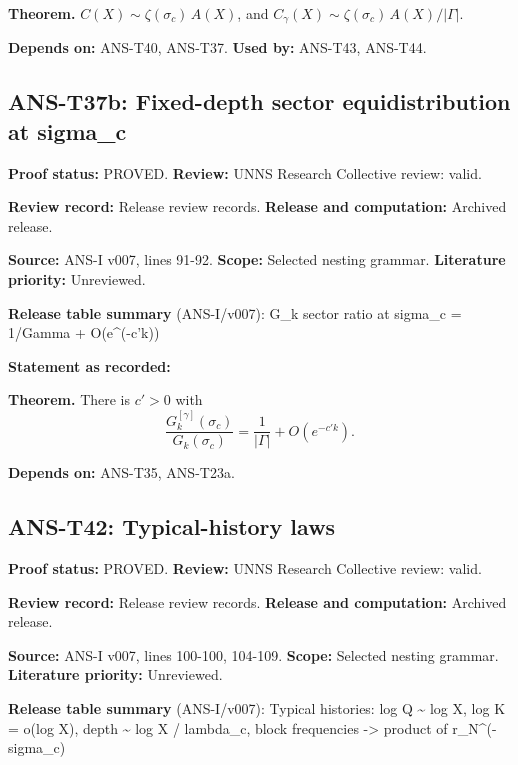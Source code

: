 \documentclass[
  11pt,
]{article}
\begin{document}
\textbf{Theorem.} \(C(X)\sim\zeta(\sigma_c)\,A(X)\), and
\(C_\gamma(X)\sim\zeta(\sigma_c)\,A(X)/|\Gamma|\).

\textbf{Depends on:} ANS-T40, ANS-T37. \textbf{Used by:} ANS-T43,
ANS-T44.

\hypertarget{ans-t37b-fixed-depth-sector-equidistribution-at-sigma_c}{%
\subsection{ANS-T37b: Fixed-depth sector equidistribution at
sigma\_c}\label{ans-t37b-fixed-depth-sector-equidistribution-at-sigma_c}}

\textbf{Proof status:} PROVED. \textbf{Review:} UNNS Research Collective
review: valid.

\textbf{Review record:} Release review records. \textbf{Release and
computation:} Archived release.

\textbf{Source:} ANS-I v007, lines 91-92. \textbf{Scope:} Selected
nesting grammar. \textbf{Literature priority:} Unreviewed.

\textbf{Release table summary} (ANS-I/v007): G\_k sector ratio at
sigma\_c = 1/\textbar Gamma\textbar{} + O(e\^{}(-c'k))

\textbf{Statement as recorded:}

\textbf{Theorem.} There is \(c'>0\) with
\[\frac{G^{[\gamma]}_k(\sigma_c)}{G_k(\sigma_c)}=\frac1{|\Gamma|}+O(e^{-c'k}).\]

\textbf{Depends on:} ANS-T35, ANS-T23a.

\hypertarget{ans-t42-typical-history-laws}{%
\subsection{ANS-T42: Typical-history
laws}\label{ans-t42-typical-history-laws}}

\textbf{Proof status:} PROVED. \textbf{Review:} UNNS Research Collective
review: valid.

\textbf{Review record:} Release review records. \textbf{Release and
computation:} Archived release.

\textbf{Source:} ANS-I v007, lines 100-100, 104-109. \textbf{Scope:}
Selected nesting grammar. \textbf{Literature priority:} Unreviewed.

\textbf{Release table summary} (ANS-I/v007): Typical histories: log Q
\textasciitilde{} log X, log K = o(log X), depth \textasciitilde{} log X
/ lambda\_c, block frequencies -\textgreater{} product of
r\_N\^{}(-sigma\_c)
\end{document}
